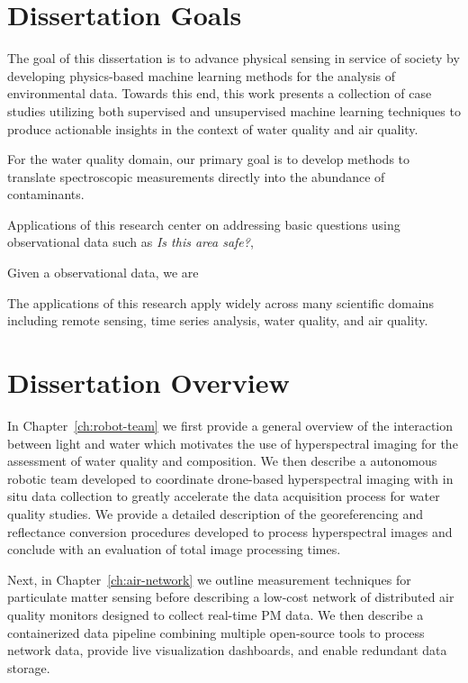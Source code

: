 \section{Dissertation Goals}

The goal of this dissertation is to advance physical sensing in service of
society by developing physics-based machine learning methods for the analysis
of environmental data. Towards this end, this work presents a collection of case
studies utilizing both supervised and unsupervised machine learning techniques
to produce actionable insights in the context of water quality and air quality.

For the water quality domain, our primary goal is to develop methods to translate
spectroscopic measurements directly into the abundance of contaminants. 



Applications of this research center on addressing basic questions using
observational data such as \textit{Is this area safe?}, 


Given a observational data, we are 

The applications of this research apply widely across many scientific domains
including remote sensing, time series analysis, water quality, and air quality.


\section{Dissertation Overview}

In Chapter~\ref{ch:robot-team} we first provide a general overview of the
interaction between light and water which motivates the use of hyperspectral imaging
for the assessment of water quality and composition. We then describe a
autonomous robotic team developed to coordinate drone-based hyperspectral imaging
with in situ data collection to greatly accelerate the data acquisition process
for water quality studies. We provide a detailed description of the
georeferencing and reflectance conversion procedures developed to process
hyperspectral images and conclude with an evaluation of total image processing times.

Next, in Chapter~\ref{ch:air-network} we outline measurement techniques for
particulate matter sensing before describing a low-cost network of distributed
air quality monitors designed to collect real-time PM data. We then describe a
containerized data pipeline combining multiple open-source tools to process
network data, provide live visualization dashboards, and enable redundant
data storage.

